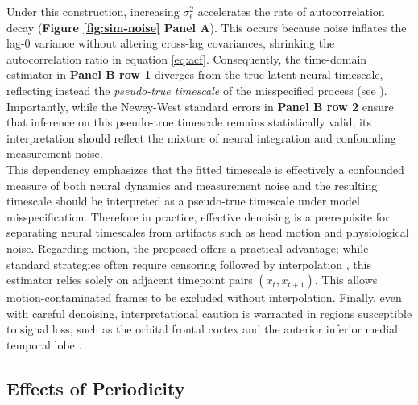 \documentclass[9pt]{article}
\begin{document}
\noindent Under this construction, increasing $\sigma^2_\epsilon$ accelerates the rate of autocorrelation decay (\textbf{Figure \ref{fig:sim-noise} Panel A}). This occurs because noise inflates the lag-0 variance without altering cross-lag covariances, shrinking the autocorrelation ratio in equation \eqref{eq:acf}. Consequently, the time-domain estimator in \textbf{Panel B row 1} diverges from the true latent neural timescale, reflecting instead the \textit{pseudo-true timescale} of the misspecified process (see ). Importantly, while the Newey-West standard errors in \textbf{Panel B row 2} ensure that inference on this pseudo-true timescale remains statistically valid, its interpretation should reflect the mixture of neural integration and confounding measurement noise.\\

This dependency emphasizes that the fitted timescale is effectively a confounded measure of both neural dynamics and measurement noise and the resulting timescale should be interpreted as a pseudo-true timescale under model misspecification. Therefore in practice, effective denoising is a prerequisite for separating neural timescales from artifacts such as head motion and physiological noise. Regarding motion, the proposed  offers a practical advantage; while standard strategies often require censoring followed by interpolation \citep{goldberg_strategies_2024}, this estimator relies solely on adjacent timepoint pairs $(x_t, x_{t+1})$. This allows motion-contaminated frames to be excluded without interpolation. Finally, even with careful denoising, interpretational caution is warranted in regions susceptible to signal loss, such as the orbital frontal cortex and the anterior inferior medial temporal lobe \citep{thomas_yeo_organization_2011, du_organization_2024}.

\subsection{Effects of Periodicity}\label{sec:periodicity}
\end{document}
